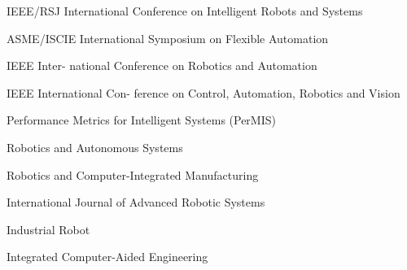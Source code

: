 



\cvservice
{IEEE/RSJ International Conference on Intelligent Robots and Systems} %

\cvservice
{ASME/ISCIE International Symposium on Flexible Automation} %

\cvservice
{IEEE Inter-
national Conference on Robotics and Automation} %

\cvservice
{IEEE International Con-
ference on Control, Automation, Robotics and Vision} %

\cvservice
{Performance Metrics
for Intelligent Systems (PerMIS)} %


\cvservice
{Robotics and Autonomous Systems} %

\cvservice
{Robotics and Computer-Integrated Manufacturing}

\cvservice
{International Journal of Advanced Robotic Systems} %

\cvservice
{Industrial Robot} %

\cvservice
{Integrated Computer-Aided Engineering} %
